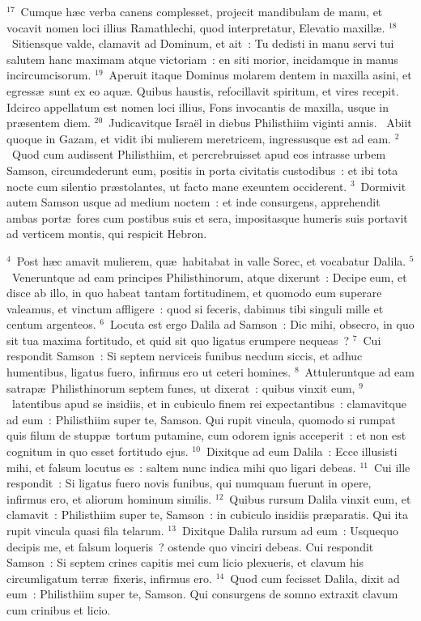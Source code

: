 ${}^{17}$~Cumque h\ae c verba canens complesset, projecit mandibulam de manu, et vocavit nomen loci illius Ramathlechi, quod interpretatur, Elevatio maxill\ae .
${}^{18}$~Sitiensque valde, clamavit ad Dominum, et ait~: Tu dedisti in manu servi tui salutem hanc maximam atque victoriam~: en siti morior, incidamque in manus incircumcisorum.
${}^{19}$~Aperuit itaque Dominus molarem dentem in maxilla asini, et egress\ae\ sunt ex eo aqu\ae . Quibus haustis, refocillavit spiritum, et vires recepit. Idcirco appellatum est nomen loci illius, Fons invocantis de maxilla, usque in pr\ae sentem diem.
${}^{20}$~Judicavitque Isra\"el in diebus Philisthiim viginti annis.
~Abiit quoque in Gazam, et vidit ibi mulierem meretricem, ingressusque est ad eam.
${}^{2}$~Quod cum audissent Philisthiim, et percrebruisset apud eos intrasse urbem Samson, circumdederunt eum, positis in porta civitatis custodibus~: et ibi tota nocte cum silentio pr\ae stolantes, ut facto mane exeuntem occiderent.
${}^{3}$~Dormivit autem Samson usque ad medium noctem~: et inde consurgens, apprehendit ambas port\ae\ fores cum postibus suis et sera, impositasque humeris suis portavit ad verticem montis, qui respicit Hebron.


${}^{4}$~Post h\ae c amavit mulierem, qu\ae\ habitabat in valle Sorec, et vocabatur Dalila.
${}^{5}$~Veneruntque ad eam principes Philisthinorum, atque dixerunt~: Decipe eum, et disce ab illo, in quo habeat tantam fortitudinem, et quomodo eum superare valeamus, et vinctum affligere~: quod si feceris, dabimus tibi singuli mille et centum argenteos.
${}^{6}$~Locuta est ergo Dalila ad Samson~: Dic mihi, obsecro, in quo sit tua maxima fortitudo, et quid sit quo ligatus erumpere nequeas~?
${}^{7}$~Cui respondit Samson~: Si septem nerviceis funibus necdum siccis, et adhuc humentibus, ligatus fuero, infirmus ero ut ceteri homines.
${}^{8}$~Attuleruntque ad eam satrap\ae\ Philisthinorum septem funes, ut dixerat~: quibus vinxit eum,
${}^{9}$~latentibus apud se insidiis, et in cubiculo finem rei expectantibus~: clamavitque ad eum~: Philisthiim super te, Samson. Qui rupit vincula, quomodo si rumpat quis filum de stupp\ae\ tortum putamine, cum odorem ignis acceperit~: et non est cognitum in quo esset fortitudo ejus.
${}^{10}$~Dixitque ad eum Dalila~: Ecce illusisti mihi, et falsum locutus es~: saltem nunc indica mihi quo ligari debeas.
${}^{11}$~Cui ille respondit~: Si ligatus fuero novis funibus, qui numquam fuerunt in opere, infirmus ero, et aliorum hominum similis.
${}^{12}$~Quibus rursum Dalila vinxit eum, et clamavit~: Philisthiim super te, Samson~: in cubiculo insidiis pr\ae paratis. Qui ita rupit vincula quasi fila telarum.
${}^{13}$~Dixitque Dalila rursum ad eum~: Usquequo decipis me, et falsum loqueris~? ostende quo vinciri debeas. Cui respondit Samson~: Si septem crines capitis mei cum licio plexueris, et clavum his circumligatum terr\ae\ fixeris, infirmus ero.
${}^{14}$~Quod cum fecisset Dalila, dixit ad eum~: Philisthiim super te, Samson. Qui consurgens de somno extraxit clavum cum crinibus et licio.


